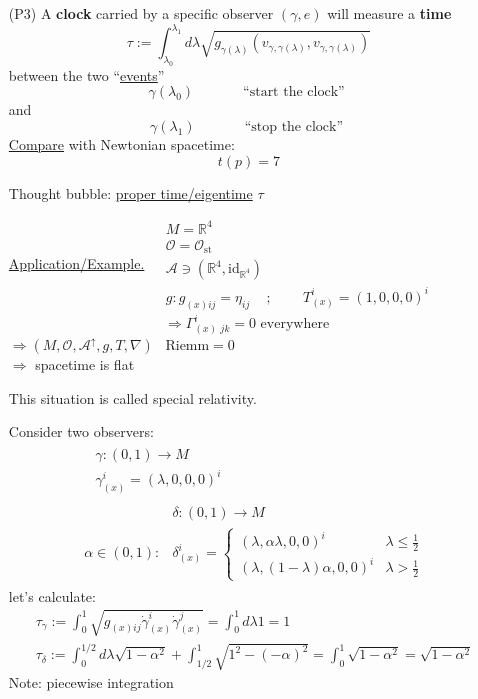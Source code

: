 \begin{enumerate}
  \item[(P3)] A \textbf{clock} carried by a specific observer $(\gamma, e)$ will measure a \textbf{time}
\[
\tau := \int_{\lambda_0}^{\lambda_1} d\lambda \sqrt{ g_{\gamma(\lambda)}(v_{\gamma,\gamma(\lambda)}, v_{\gamma,\gamma(\lambda)}) }
\]
between the two ``\underline{events}''
\[
\gamma(\lambda_0) \quad \quad \quad \, \text{ ``start the clock'' }
\]
and 
\[
\gamma(\lambda_1) \quad \quad \quad \, \text{ ``stop the clock'' }
\]
\underline{Compare} with Newtonian spacetime:
\[
t(p)=7
\]

Thought bubble: \underline{proper time/eigentime} $\tau$

\underline{Application/Example.}
$\begin{aligned}
& M = \mathbb{R}^4 \\ 
 & \mathcal{O} = \mathcal{O}_{\text{st}} \\
  & \mathcal{A} \ni (\mathbb{R}^4, \text{id}_{\mathbb{R}^4} ) \\ 
  & g : g_{(x)ij} = \eta_{ij} \quad \, ; \quad \quad \, T_{(x)}^i =(1,0,0,0)^i
\end{aligned}
$
\[
\Longrightarrow \Gamma_{(x) \, \, jk }^i = 0 \text{ everywhere }
\]
$\Longrightarrow (M,\mathcal{O}, \mathcal{A}^{\uparrow},g,T,\nabla)$ \quad \, $\text{Riemm}=0$ \\
$\Longrightarrow $ spacetime is flat

This situation is called special relativity.

Consider two observers: 
\[
\begin{aligned} & 
\begin{aligned}
& \gamma : (0,1) \to M \\ 
 & \gamma_{(x)}^i = (\lambda , 0 ,0  ,0 )^i \end{aligned} \\
& 
\begin{aligned}
  & \delta :(0,1) \to M \\
\alpha \in (0,1) :   & \delta_{(x)}^i = \begin{cases} ( \lambda , \alpha \lambda , 0 , 0)^i & \lambda \leq \frac{1}{2} \\ 
    (\lambda, (1-\lambda)\alpha, 0,0)^i & \lambda > \frac{1}{2} \end{cases}
\end{aligned}
\end{aligned}
\]
let's calculate:
\[
\begin{aligned}
  & \tau_{\gamma}:= \int_0^1 \sqrt{ g_{(x)ij} \dot{\gamma}^i_{(x)} \dot{\gamma}^j_{(x)} } = \int_0^1 d\lambda 1 = 1 \\
  & \tau_{\delta} := \int_0^{1/2} d\lambda \sqrt{ 1- \alpha^2} + \int_{1/2}^1 \sqrt{ 1^2 - (-\alpha)^2 } = \int_0^1 \sqrt{ 1 - \alpha^2 } = \sqrt{ 1 - \alpha^2}
\end{aligned}
\]
Note: piecewise integration


\end{enumerate}
